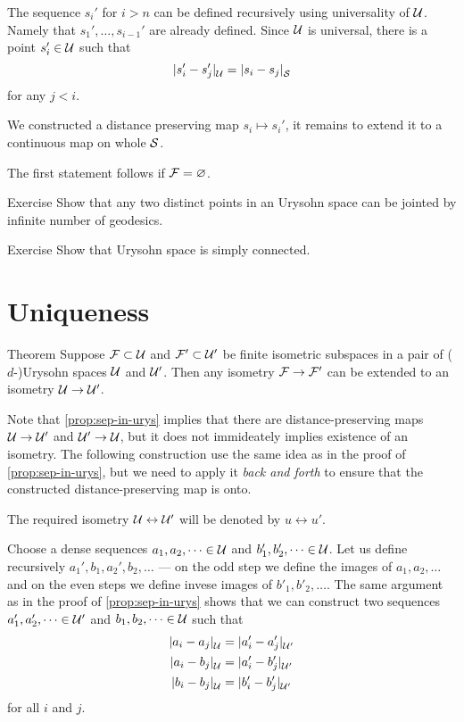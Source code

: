 The sequence $s_i'$ for $i>n$ can be defined recursively using universality of $\mathcal{U}$.
Namely that $s_1',\dots,s_{i-1}'$ are already defined.
Since $\mathcal{U}$ is universal, there is a point $s_i'\in \mathcal{U}$ such that
\[\dist{s_i'}{s_j'}{\spc{U}}=\dist{s_i}{s_j}{\spc{S}}\]
for any $j<i$.

We constructed a distance preserving map $s_i\mapsto s_i'$, it remains to extend it to a continuous map on whole $\mathcal{S}$.

The first statement follows if $\mathcal{F}=\varnothing$.\qeds

\begin{thm}{Exercise}\label{ex:geodesics-urysohn}
Show that any two distinct points in an Urysohn space can be jointed by infinite number of geodesics.
\end{thm}

\begin{thm}{Exercise}\label{ex:sc-urysohn}
Show that Urysohn space is simply connected.
\end{thm}

\section{Uniqueness}

\begin{thm}{Theorem}\label{thm:urysohn-unique}
Suppose $\mathcal{F}\subset \mathcal{U}$ and $\mathcal{F}'\subset \mathcal{U}'$ be finite isometric subspaces in a pair of ($d$-)Urysohn spaces $\mathcal{U}$ and $\mathcal{U}'$.
Then any isometry $\mathcal{F}\to \mathcal{F}'$ can be extended to an isometry $\mathcal{U}\to \mathcal{U}'$.

\end{thm}

Note that \ref{prop:sep-in-urys} implies that there are distance-preserving maps $\mathcal{U}\to \mathcal{U}'$ and $\mathcal{U}'\to \mathcal{U}$,
but it does not immideately implies existence of an isometry.
The following construction use the same idea as in the proof of \ref{prop:sep-in-urys}, but we need to apply it \emph{back and forth} to ensure that the constructed distance-preserving map is onto.

The required isometry $\mathcal{U}\leftrightarrow \mathcal{U}'$ will be denoted by $u \leftrightarrow u'$.

Choose a dense sequences $a_1,a_2,\dots\in \mathcal{U}$ and $b'_1,b'_2,\dots\in \mathcal{U}$.
Let us define recursively $a_1',b_1, a_2', b_2,\dots$ --- on the odd step we define the images of $a_1,a_2,\dots$ and on the even steps we define invese images of $b'_1,b'_2,\dots$.
The same argument as in the proof of \ref{prop:sep-in-urys} shows that we can construct two sequences $a_1',a_2',\dots\in \mathcal{U}'$ and $b_1,b_2,\dots\in \mathcal{U}$ such that
\begin{align*}
\dist{a_i}{a_j}{\spc{U}}&=\dist{a_i'}{a_j'}{\spc{U}'}
\\
\dist{a_i}{b_j}{\spc{U}}&=\dist{a_i'}{b_j'}{\spc{U}'}
\\
\dist{b_i}{b_j}{\spc{U}}&=\dist{b_i'}{b_j'}{\spc{U}'}
\end{align*}
for all $i$ and $j$.

